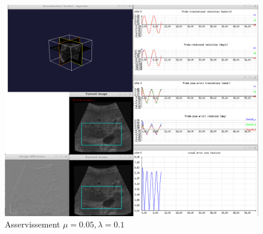 \documentclass[a4paper,11pt]{article}
\begin{document}
\begin{figure}[H]
    \centering
    \includegraphics[width=0.5\textheight]{./images/q12_lambda=0,1.png}
    \caption{Asservissement $\mu = 0.05, \lambda = 0.1$ }
    \label{q12_2}
\end{figure}
\end{document}
